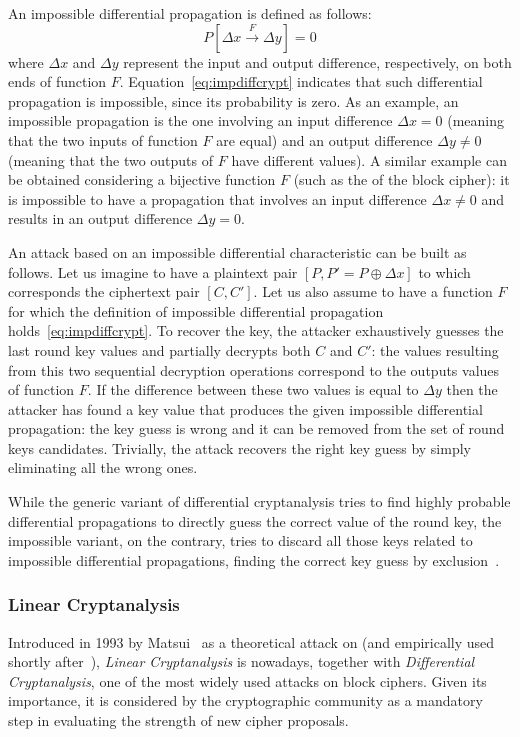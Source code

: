             An impossible differential propagation is defined as follows:
            \begin{equation}\label{eq:impdiffcrypt}
                P[\Delta x \xrightarrow[]{F} \Delta y] = 0
            \end{equation}
            where $\Delta x$ and $\Delta y$ represent the input and output difference, respectively, on both ends of function $F$. Equation~\ref{eq:impdiffcrypt} indicates that such differential propagation is impossible, since its probability is zero. As an example, an impossible propagation is the one involving an input difference $\Delta x = 0$ (meaning that the two inputs of function $F$ are equal) and an output difference $\Delta y \neq 0$ (meaning that the two outputs of $F$ have different values). A similar example can be obtained considering a bijective function $F$ (such as the \sbocs{} of the \aes{} block cipher): it is impossible to have a propagation that involves an input difference $\Delta x \neq 0$ and results in an output difference $\Delta y = 0$.

            An attack based on an impossible differential characteristic can be built as follows. Let us imagine to have a plaintext pair $[P, P' = P \oplus \Delta x]$ to which corresponds the ciphertext pair $[C, C']$. Let us also assume to have a function $F$ for which the definition of impossible differential propagation holds~\ref{eq:impdiffcrypt}. To recover the key, the attacker exhaustively guesses the last round key values and partially decrypts both $C$ and $C'$: the values resulting from this two sequential decryption operations correspond to the outputs values of function $F$. If the difference between these two values is equal to $\Delta y$ then the attacker has found a key value that produces the given impossible differential propagation: the key guess is wrong and it can be removed from the set of round keys candidates. Trivially, the attack recovers the right key guess by simply eliminating all the wrong ones.

            While the generic variant of differential cryptanalysis tries to find highly probable differential propagations to directly guess the correct value of the round key, the impossible variant, on the contrary, tries to discard all those keys related to impossible differential propagations, finding the correct key guess by exclusion~\cite{sakiyama2016security}.

        \subsubsection{Linear Cryptanalysis}\label{subsubsec:linear_crypt}
            Introduced in 1993 by Matsui~\cite{matsui1993linear} as a theoretical attack on \des{} (and empirically used shortly after~\cite{matsui1994first}), \emph{Linear Cryptanalysis} is nowadays, together with \emph{Differential Cryptanalysis}, one of the most widely used attacks on block ciphers. Given its importance, it is considered by the cryptographic community as a mandatory step in evaluating the strength of new cipher proposals.

